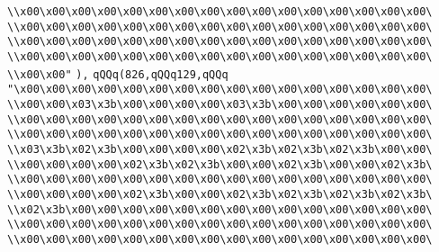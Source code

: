 \verb|\\x00\x00\x00\x00\x00\x00\x00\x00\x00\x00\x00\x00\x00\x00\x00\x00\|\newline
\verb|\\x00\x00\x00\x00\x00\x00\x00\x00\x00\x00\x00\x00\x00\x00\x00\x00\|\newline
\verb|\\x00\x00\x00\x00\x00\x00\x00\x00\x00\x00\x00\x00\x00\x00\x00\x00\|\newline
\verb|\\x00\x00\x00\x00\x00\x00\x00\x00\x00\x00\x00\x00\x00\x00\x00\x00\|\newline
\verb|\\x00\x00"|\newline
\verb|),|\newline
\verb|qQQq(826,qQQq129,qQQq|\newline
\verb|"\x00\x00\x00\x00\x00\x00\x00\x00\x00\x00\x00\x00\x00\x00\x00\x00\|\newline
\verb|\\x00\x00\x03\x3b\x00\x00\x00\x00\x03\x3b\x00\x00\x00\x00\x00\x00\|\newline
\verb|\\x00\x00\x00\x00\x00\x00\x00\x00\x00\x00\x00\x00\x00\x00\x00\x00\|\newline
\verb|\\x00\x00\x00\x00\x00\x00\x00\x00\x00\x00\x00\x00\x00\x00\x00\x00\|\newline
\verb|\\x03\x3b\x02\x3b\x00\x00\x00\x00\x02\x3b\x02\x3b\x02\x3b\x00\x00\|\newline
\verb|\\x00\x00\x00\x00\x02\x3b\x02\x3b\x00\x00\x02\x3b\x00\x00\x02\x3b\|\newline
\verb|\\x00\x00\x00\x00\x00\x00\x00\x00\x00\x00\x00\x00\x00\x00\x00\x00\|\newline
\verb|\\x00\x00\x00\x00\x02\x3b\x00\x00\x02\x3b\x02\x3b\x02\x3b\x02\x3b\|\newline
\verb|\\x02\x3b\x00\x00\x00\x00\x00\x00\x00\x00\x00\x00\x00\x00\x00\x00\|\newline
\verb|\\x00\x00\x00\x00\x00\x00\x00\x00\x00\x00\x00\x00\x00\x00\x00\x00\|\newline
\verb|\\x00\x00\x00\x00\x00\x00\x00\x00\x00\x00\x00\x00\x00\x00\x00\x00\|\newline

